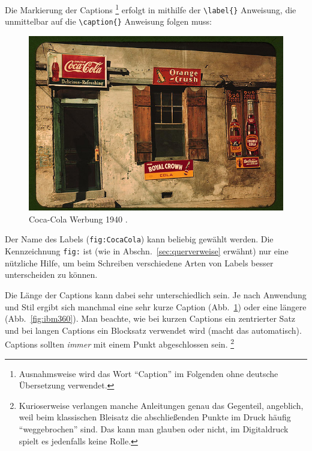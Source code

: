 Die Markierung der Captions%
\footnote{Ausnahmsweise wird das Wort "`Caption"' im Folgenden
ohne deutsche Übersetzung verwendet.} erfolgt in \latex mithilfe
der \verb!\label{}! Anweisung, die unmittelbar auf die
\verb!\caption{}! Anweisung folgen muss:
%
\begin{LaTeXCode}
\begin{figure}
\centering
\includegraphics[width=.95\textwidth]{cola-public-domain-photo-p}
\caption{Coca-Cola Werbung 1940 \cite{CocaCola1940}.}
\label{fig:CocaCola}
\end{figure}
\end{LaTeXCode}
%
Der Name des Labels (\texttt{fig:CocaCola}) kann beliebig gewählt werden. 
Die Kennzeichnung \texttt{fig:} ist (wie in Abschn.\ \ref{sec:querverweise} 
erwähnt) nur eine nützliche Hilfe, um beim Schreiben verschiedene Arten 
von Labels besser unterscheiden zu können.

Die Länge der Captions kann dabei sehr unterschiedlich sein. Je
nach Anwendung und Stil ergibt sich manchmal eine sehr kurze
Caption (Abb.~\ref{fig:CocaCola}) oder eine längere
(Abb.~\ref{fig:ibm360}).
Man beachte, wie bei kurzen Captions ein
zentrierter Satz und bei langen Captions ein Blocksatz verwendet
wird (\latex macht das automatisch).
Captions sollten \emph{immer} mit einem Punkt abgeschlossen sein.%
\footnote{Kurioserweise verlangen manche Anleitungen
genau das Gegenteil, angeblich, weil beim klassischen Bleisatz 
die abschließenden Punkte im Druck häufig "`weggebrochen"' sind. 
Das kann man glauben oder nicht, im Digitaldruck 
spielt es jedenfalls keine Rolle.}

